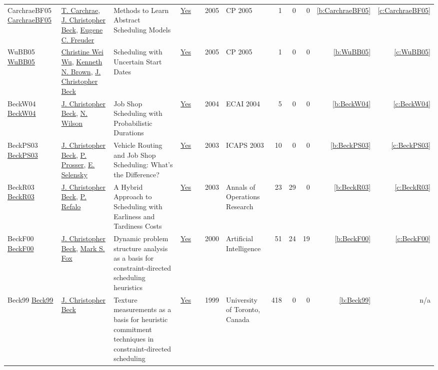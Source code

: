 {\begin{longtable}{>{\raggedright\arraybackslash}p{3cm}>{\raggedright\arraybackslash}p{6cm}>{\raggedright\arraybackslash}p{6.5cm}rrrp{2.5cm}rrrrr}
CarchraeBF05 \href{https://doi.org/10.1007/11564751\_80}{CarchraeBF05} & \hyperref[auth:a275]{T. Carchrae}, \hyperref[auth:a89]{J. Christopher Beck}, \hyperref[auth:a276]{Eugene C. Freuder} & Methods to Learn Abstract Scheduling Models & \href{works/CarchraeBF05.pdf}{Yes} & \cite{CarchraeBF05} & 2005 & CP 2005 & 1 & 0 & 0 & \ref{b:CarchraeBF05} & \ref{c:CarchraeBF05}\\
WuBB05 \href{https://doi.org/10.1007/11564751\_110}{WuBB05} & \hyperref[auth:a277]{Christine Wei Wu}, \hyperref[auth:a223]{Kenneth N. Brown}, \hyperref[auth:a89]{J. Christopher Beck} & Scheduling with Uncertain Start Dates & \href{works/WuBB05.pdf}{Yes} & \cite{WuBB05} & 2005 & CP 2005 & 1 & 0 & 0 & \ref{b:WuBB05} & \ref{c:WuBB05}\\
BeckW04 \href{}{BeckW04} & \hyperref[auth:a89]{J. Christopher Beck}, \hyperref[auth:a838]{N. Wilson} & Job Shop Scheduling with Probabilistic Durations & \href{works/BeckW04.pdf}{Yes} & \cite{BeckW04} & 2004 & ECAI 2004 & 5 & 0 & 0 & \ref{b:BeckW04} & \ref{c:BeckW04}\\
BeckPS03 \href{http://www.aaai.org/Library/ICAPS/2003/icaps03-027.php}{BeckPS03} & \hyperref[auth:a89]{J. Christopher Beck}, \hyperref[auth:a839]{P. Prosser}, \hyperref[auth:a840]{E. Selensky} & Vehicle Routing and Job Shop Scheduling: What's the Difference? & \href{works/BeckPS03.pdf}{Yes} & \cite{BeckPS03} & 2003 & ICAPS 2003 & 10 & 0 & 0 & \ref{b:BeckPS03} & \ref{c:BeckPS03}\\
BeckR03 \href{https://doi.org/10.1023/A:1021849405707}{BeckR03} & \hyperref[auth:a89]{J. Christopher Beck}, \hyperref[auth:a257]{P. Refalo} & A Hybrid Approach to Scheduling with Earliness and Tardiness Costs & \href{works/BeckR03.pdf}{Yes} & \cite{BeckR03} & 2003 & Annals of Operations Research & 23 & 29 & 0 & \ref{b:BeckR03} & \ref{c:BeckR03}\\
BeckF00 \href{https://doi.org/10.1016/S0004-3702(99)00099-5}{BeckF00} & \hyperref[auth:a89]{J. Christopher Beck}, \hyperref[auth:a305]{Mark S. Fox} & Dynamic problem structure analysis as a basis for constraint-directed scheduling heuristics & \href{works/BeckF00.pdf}{Yes} & \cite{BeckF00} & 2000 & Artificial Intelligence & 51 & 24 & 19 & \ref{b:BeckF00} & \ref{c:BeckF00}\\
Beck99 \href{https://librarysearch.library.utoronto.ca/permalink/01UTORONTO\_INST/14bjeso/alma991106162342106196}{Beck99} & \hyperref[auth:a89]{J. Christopher Beck} & Texture measurements as a basis for heuristic commitment techniques in constraint-directed scheduling & \href{works/Beck99.pdf}{Yes} & \cite{Beck99} & 1999 & University of Toronto, Canada & 418 & 0 & 0 & \ref{b:Beck99} & n/a\\

\end{longtable}}
